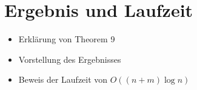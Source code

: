 \section{Ergebnis und Laufzeit}
\label{sec/ergebnis}

\begin{itemize}
	\item Erklärung von Theorem 9
	\item Vorstellung des Ergebnisses
	\item Beweis der Laufzeit von $O((n+m)\log n)$
\end{itemize}
